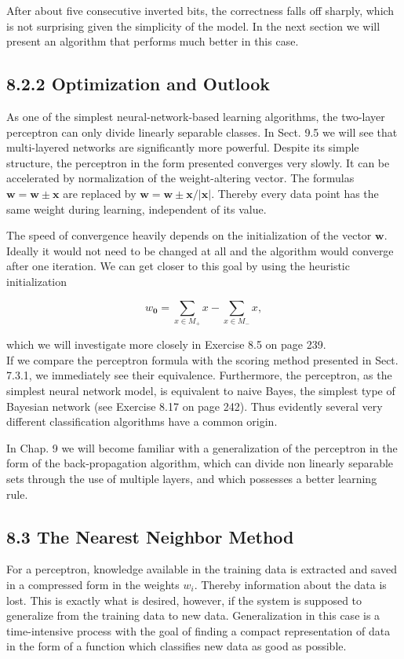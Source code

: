 \documentclass[10pt]{book}
\begin{document}
\begin{center}
\begin{enumerate}
\begin{center}
After about five consecutive inverted bits, the correctness falls off sharply, which is not surprising given the simplicity of the model. In the next section we will present an algorithm that performs much better in this case.

\subsection*{8.2.2 Optimization and Outlook}
As one of the simplest neural-network-based learning algorithms, the two-layer perceptron can only divide linearly separable classes. In Sect. 9.5 we will see that multi-layered networks are significantly more powerful. Despite its simple\\
structure, the perceptron in the form presented converges very slowly. It can be accelerated by normalization of the weight-altering vector. The formulas $\boldsymbol{w}=\boldsymbol{w} \pm \boldsymbol{x}$ are replaced by $\boldsymbol{w}=\boldsymbol{w} \pm \boldsymbol{x} /|\boldsymbol{x}|$. Thereby every data point has the same weight during learning, independent of its value.

The speed of convergence heavily depends on the initialization of the vector $\boldsymbol{w}$. Ideally it would not need to be changed at all and the algorithm would converge after one iteration. We can get closer to this goal by using the heuristic initialization

$$
w_{\mathbf{0}}=\sum_{x \in M_{+}} x-\sum_{x \in M_{-}} x,
$$

which we will investigate more closely in Exercise 8.5 on page 239.\\
If we compare the perceptron formula with the scoring method presented in Sect. 7.3.1, we immediately see their equivalence. Furthermore, the perceptron, as the simplest neural network model, is equivalent to naive Bayes, the simplest type of Bayesian network (see Exercise 8.17 on page 242). Thus evidently several very different classification algorithms have a common origin.

In Chap. 9 we will become familiar with a generalization of the perceptron in the form of the back-propagation algorithm, which can divide non linearly separable sets through the use of multiple layers, and which possesses a better learning rule.

\subsection*{8.3 The Nearest Neighbor Method}
For a perceptron, knowledge available in the training data is extracted and saved in a compressed form in the weights $w_{i}$. Thereby information about the data is lost. This is exactly what is desired, however, if the system is supposed to generalize from the training data to new data. Generalization in this case is a time-intensive process with the goal of finding a compact representation of data in the form of a function which classifies new data as good as possible.


\end{center}
\end{enumerate}
\end{center}
\end{document}
